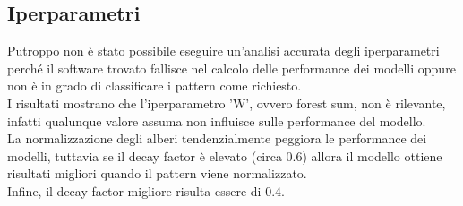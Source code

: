 \subsection{Iperparametri}

Putroppo non è stato possibile eseguire un'analisi accurata degli iperparametri
perché il software trovato fallisce nel calcolo delle performance dei modelli
oppure non è in grado di classificare i pattern come richiesto.\\
I risultati mostrano che l'iperparametro 'W', ovvero forest sum, non è
rilevante, infatti qualunque valore assuma non influisce sulle performance del
modello.\\
La normalizzazione degli alberi tendenzialmente peggiora le performance dei 
modelli, tuttavia se il decay factor è elevato (circa 0.6) allora il modello
ottiene risultati migliori quando il pattern viene normalizzato.\\
Infine, il decay factor migliore risulta essere di 0.4.
